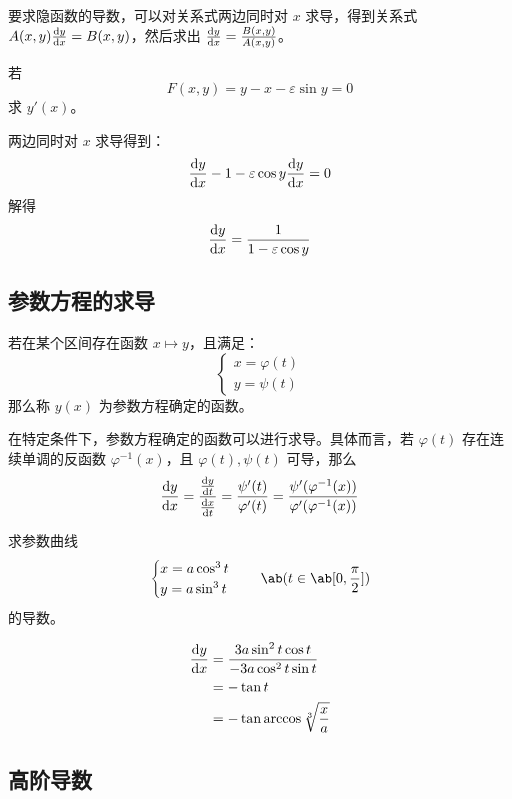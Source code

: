 要求隐函数的导数，可以对关系式两边同时对 $x$ 求导，得到关系式 $A(x, y) \dv{y}{x} = B(x, y)$，然后求出 $\dv{y}{x} = \frac{B(x, y)}{A(x, y)}$。

\begin{example}
	若
	$$
	F(x, y) = y - x - \varepsilon \sin y = 0
	$$
	求 $y'(x)$。

	\begin{solution}
		两边同时对 $x$ 求导得到：
		$$
		\dv{y}{x} - 1 - \varepsilon \cos y \dv{y}{x} = 0
		$$
		解得
		$$
		\dv{y}{x} = \frac{1}{1 - \varepsilon \cos y}
		$$
	\end{solution}
\end{example}

\subsection{参数方程的求导}

\begin{definition}
	若在某个区间存在函数 $x \mapsto y$，且满足：
	$$
	\begin{cases}
		x = \varphi(t) \\
		y = \psi(t)
	\end{cases}
	$$
	那么称 $y(x)$ 为参数方程确定的函数。
\end{definition}

在特定条件下，参数方程确定的函数可以进行求导。具体而言，若 $\varphi(t)$ 存在连续单调的反函数 $\varphi^{-1}(x)$，且 $\varphi(t), \psi(t)$ 可导，那么
$$
\dv{y}{x} = \frac{\dv{y}{t}}{\dv{x}{t}} = \frac{\psi'(t)}{\varphi'(t)} = \frac{\psi'(\varphi^{-1}(x))}{\varphi'(\varphi^{-1}(x))}
$$

\begin{example}
	求参数曲线
	$$
	\begin{cases}
		x = a \cos^3 t \\
		y = a \sin^3 t
	\end{cases}\quad \ab(t \in \ab[0, \frac{\pi}{2}])
	$$
	的导数。

	\begin{solution}
		$$
		\begin{aligned}
			\dv{y}{x} & = \frac{3a \sin^2 t \cos t}{-3a \cos^2 t \sin t} \\
			& = -\tan t \\
			& = -\tan \arccos \sqrt[3]{\frac{x}{a}}
		\end{aligned}
		$$
	\end{solution}
\end{example}

\subsection{高阶导数}

